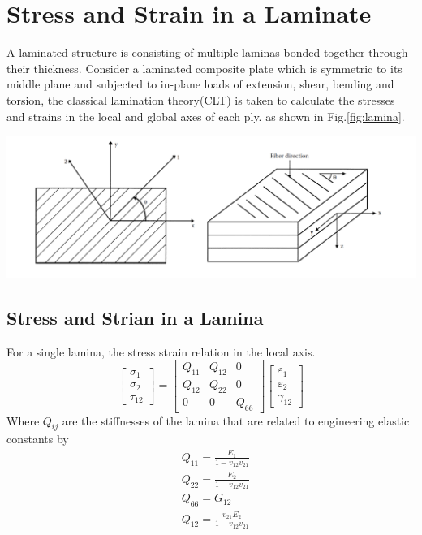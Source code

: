 \documentclass[smallextended]{svjour3}       %
\begin{document}
\section{Stress and Strain in a Laminate}
A laminated structure is consisting of multiple laminas bonded together through
their thickness.  Consider a laminated composite plate which is symmetric to
its middle plane and subjected to in-plane loads of extension, shear, bending
and torsion,  the classical lamination theory(CLT) is taken to calculate the
stresses and strains in the local and global axes of each ply. as shown in
Fig.\ref{fig:lamina}.

\begin{center}
  \includegraphics[width=\linewidth]{A_laminate_design_images/lamina_local_global_axes.png}
  \label{fig:lamina}
\end{center}

\subsection{Stress and Strian in a Lamina}
For a single lamina, the stress strain relation in the local axis.
\begin{equation}
    \begin{bmatrix}
        \sigma_1\\
        \sigma_2\\
        \tau_{12}
    \end{bmatrix}
    =
    \begin{bmatrix}
        Q_{11} & Q_{12} & 0\\
        Q_{12} & Q_{22} & 0\\
        0      &  0     & Q_{66}
    \end{bmatrix}
    \begin{bmatrix}
        \varepsilon_1\\
        \varepsilon_2\\
		\gamma_{12}
    \end{bmatrix}
\end{equation}
Where $Q_{ij}$ are the stiffnesses of the lamina that are related to 
engineering elastic constants by
\begin{equation}
    \begin{split}
    &Q_{11}=\frac{E_1}{1-v_{12}v_{21}}\\
    &Q_{22}=\frac{E_2}{1-v_{12}v_{21}}\\
    &Q_{66}=G_{12}\\
    &Q_{12}=\frac{v_{21}E_2}{1-v_{12}v_{21}}\\
    \end{split}
\end{equation}
\end{document}
